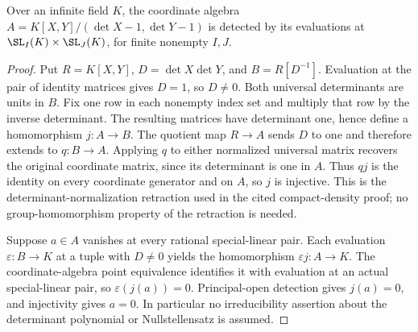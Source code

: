 \begin{lemma}
\label{lem:balanced-special-linear-detection}
\leanok
Over an infinite field $K$, the coordinate algebra
$A=K[X,Y]/(\det X-1,\det Y-1)$ is detected by its evaluations at
$\SL_I(K)\times\SL_J(K)$, for finite nonempty $I,J$.
\end{lemma}
\begin{proof}
Put $R=K[X,Y]$, $D=\det X\det Y$, and $B=R[D^{-1}]$.
Evaluation at the pair of identity matrices gives $D=1$, so $D\ne0$.
Both universal determinants are units in $B$. Fix one row in each
nonempty index set and multiply that row by the inverse determinant.
The resulting matrices have determinant one, hence define a homomorphism
$j:A\to B$. The quotient map $R\to A$ sends $D$ to one and therefore
extends to $q:B\to A$. Applying $q$ to either normalized universal
matrix recovers the original coordinate matrix, since its determinant
is one in $A$. Thus $qj$ is the identity on every coordinate generator
and on $A$, so $j$ is injective. This is the determinant-normalization
retraction used in the cited compact-density proof; no group-homomorphism
property of the retraction is needed.

Suppose $a\in A$ vanishes at every rational special-linear pair.
Each evaluation $\varepsilon:B\to K$ at a tuple with $D\ne0$ yields
the homomorphism $\varepsilon j:A\to K$. The coordinate-algebra point
equivalence identifies it with evaluation at an actual special-linear
pair, so $\varepsilon(j(a))=0$. Principal-open detection gives $j(a)=0$,
and injectivity gives $a=0$. In particular no irreducibility assertion
about the determinant polynomial or Nullstellensatz is assumed.
\end{proof}

